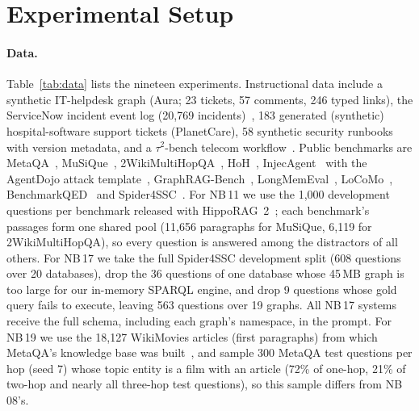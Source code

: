 \documentclass[11pt,a4paper]{article}
\newcommand{\nb}[1]{NB\,#1}
\begin{document}
\section{Experimental Setup}
\label{sec:setup}

\paragraph{Data.} Table~\ref{tab:data} lists the nineteen experiments. Instructional data include a synthetic
IT-helpdesk graph (Aura; 23 tickets, 57 comments, 246 typed links), the ServiceNow incident event log
(20{,}769 incidents)~\cite{uci2018incident}, 183 generated (synthetic) hospital-software support tickets (PlanetCare), 58 synthetic security runbooks with
version metadata, and a $\tau^2$-bench telecom workflow~\cite{barres2025tau2}. Public benchmarks are
MetaQA~\cite{zhang2018metaqa}, MuSiQue~\cite{trivedi2022musique}, 2WikiMultiHopQA~\cite{ho2020twowiki},
HoH~\cite{ouyang2025hoh}, InjecAgent~\cite{zhan2024injecagent} with the AgentDojo attack
template~\cite{debenedetti2024agentdojo}, GraphRAG-Bench~\cite{xiang2025graphragbench},
LongMemEval~\cite{wu2025longmemeval}, LoCoMo~\cite{maharana2024locomo}, BenchmarkQED~\cite{benchmarkqed2025} and
Spider4SSC~\cite{vejvar2025spider4ssc,yu2018spider}. For \nb{11} we use the 1{,}000 development questions per benchmark
released with HippoRAG~2~\cite{gutierrez2025hipporag2}; each benchmark's passages form one shared pool (11{,}656
paragraphs for MuSiQue, 6{,}119 for 2WikiMultiHopQA), so every question is answered among the distractors of all
others. For \nb{17} we take the full Spider4SSC development split (608 questions over 20 databases), drop the 36
questions of one database whose 45\,MB graph is too large for our in-memory SPARQL engine, and drop 9 questions whose
gold query fails to execute, leaving 563 questions over 19 graphs. All \nb{17} systems receive the full schema,
including each graph's namespace, in the prompt. For \nb{19} we use the 18{,}127 WikiMovies articles (first
paragraphs) from which MetaQA's knowledge base was built~\cite{miller2016kvmemnn}, and sample 300 MetaQA test
questions per hop (seed 7) whose topic entity is a film with an article (72\% of one-hop, 21\% of two-hop and nearly
all three-hop test questions), so this sample differs from \nb{08}'s.
\end{document}
